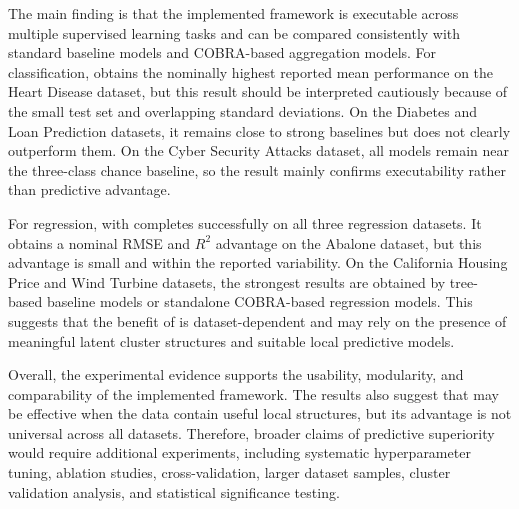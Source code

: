 The main finding is that the implemented \KFCProcedure{} framework is executable across multiple supervised learning tasks and can be compared consistently with standard baseline models and COBRA-based aggregation models. For classification,  obtains the nominally highest reported mean performance on the Heart Disease dataset, but this result should be interpreted cautiously because of the small test set and overlapping standard deviations. On the Diabetes and Loan Prediction datasets, it remains close to strong baselines but does not clearly outperform them. On the Cyber Security Attacks dataset, all models remain near the three-class chance baseline, so the result mainly confirms executability rather than predictive advantage.

For regression,  with  completes successfully on all three regression datasets. It obtains a nominal RMSE and $R^2$ advantage on the Abalone dataset, but this advantage is small and within the reported variability. On the California Housing Price and Wind Turbine datasets, the strongest results are obtained by tree-based baseline models or standalone COBRA-based regression models. This suggests that the benefit of \KFCProcedure{} is dataset-dependent and may rely on the presence of meaningful latent cluster structures and suitable local predictive models.

Overall, the experimental evidence supports the usability, modularity, and comparability of the implemented framework. The results also suggest that \KFCProcedure{} may be effective when the data contain useful local structures, but its advantage is not universal across all datasets. Therefore, broader claims of predictive superiority would require additional experiments, including systematic hyperparameter tuning, ablation studies, cross-validation, larger dataset samples, cluster validation analysis, and statistical significance testing.

